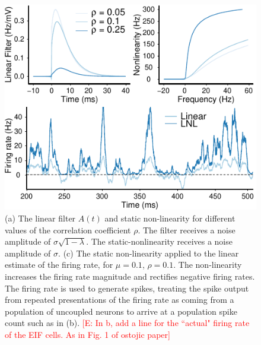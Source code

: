 \documentclass[%
 reprint,
 twocolumn,
 amsmath,amssymb,
 aps,
floatfix,
]{revtex4}
\newcommand{\Ecomment}[1]{\textcolor{red}{[E: #1]}}
\begin{document}
\begin{figure}[t!]
\includegraphics{figures/fig_3a}
\caption{\label{fig:schematic2}  (a) The linear filter $A(t)$ and static non-linearity for different values of the correlation coefficient $\rho$. The filter receives a noise amplitude of $\sigma\sqrt{1-\lambda}$. The static-nonlinearity receives a noise amplitude of $\sigma$. (c) The static non-linearity applied to the linear estimate of the firing rate, for $\mu = 0.1$, $\rho = 0.1$. The non-linearity increases the firing rate magnitude and rectifies negative firing rates. The firing rate is used to generate spikes, treating the spike output from repeated presentations of the firing rate as coming from a population of uncoupled neurons to arrive at a population spike count such as in (b).  \Ecomment{In b, add a line for the ``actual" firing rate of the EIF cells. As in Fig. 1 of ostojic paper}}
\end{figure}
\end{document}
